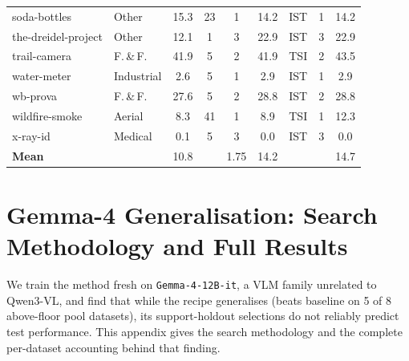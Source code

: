 \documentclass{article}
\newcommand{\qwen}{Qwen3-VL}
\begin{document}
\begin{table}[h]
\begin{tabular}{llcc|cc|ccc}
    soda-bottles              & Other       & 15.3 &  23 & 1 & 14.2 & IST & 1 & 14.2 \\
    the-dreidel-project       & Other       & 12.1 &   1 & 3 & 22.9 & IST & 3 & 22.9 \\
    trail-camera              & F.\,\&\,F.  & 41.9 &   5 & 2 & 41.9 & TSI & 2 & 43.5 \\
    water-meter               & Industrial  &  2.6 &   5 & 1 &  2.9 & IST & 1 &  2.9 \\
    wb-prova                  & F.\,\&\,F.  & 27.6 &   5 & 2 & 28.8 & IST & 2 & 28.8 \\
    wildfire-smoke            & Aerial      &  8.3 &  41 & 1 &  8.9 & TSI & 1 & 12.3 \\
    x-ray-id                  & Medical     &  0.1 &   5 & 3 &  0.0 & IST & 3 &  0.0 \\
    \midrule
    \textbf{Mean}             &             & 10.8 & & 1.75 & 14.2 & & & 14.7 \\
    \bottomrule
  \end{tabular}
\end{table}

\section{Gemma-4 Generalisation: Search Methodology and Full Results}
\label{app:gemma4}

We train the method fresh on \texttt{Gemma-4-12B-it}, a VLM family unrelated
to \qwen{}, and find that while the recipe generalises (beats baseline on 5 of
8 above-floor pool datasets), its support-holdout selections do not reliably
predict test performance.
This appendix gives the search methodology and the complete per-dataset accounting behind that finding.
\end{document}
